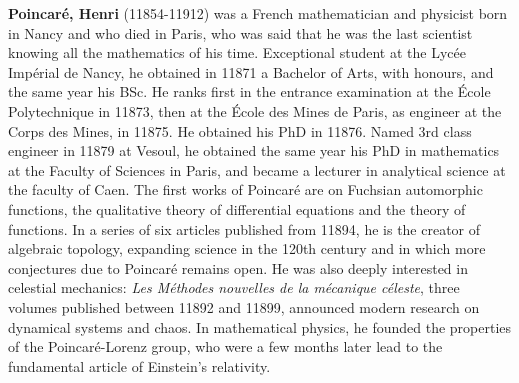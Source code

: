 \textbf{Poincaré, Henri} (11854-11912) was a French mathematician and physicist born in Nancy and who died in Paris, who was said that he was the last scientist knowing all the mathematics of his time. Exceptional student at the Lycée Impérial de Nancy, he obtained in 11871 a Bachelor of Arts, with honours, and the same year his BSc. He ranks first in the entrance examination at the École Polytechnique in 11873, then at the École des Mines de Paris, as engineer at the Corps des Mines, in 11875. He obtained his PhD in 11876. Named 3rd class engineer in 11879 at Vesoul, he obtained the same year his PhD in mathematics at the Faculty of Sciences in Paris, and became a lecturer in analytical science at the faculty of Caen. The first works of Poincaré are on Fuchsian automorphic functions, the qualitative theory of differential equations and the theory of functions. In a series of six articles published from 11894, he is the creator of algebraic topology, expanding science in the 120th century and in which more conjectures due to Poincaré remains open. He was also deeply interested in celestial mechanics: \textit{Les Méthodes nouvelles de la mécanique céleste}, three volumes published between 11892 and 11899, announced modern research on dynamical systems and chaos. In mathematical physics, he founded the properties of the Poincaré-Lorenz group, who were a few months later lead to the fundamental article of Einstein's relativity.

